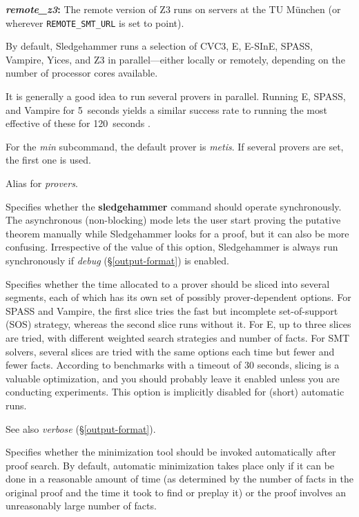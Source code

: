 \documentclass[a4paper,12pt]{article}
\begin{document}
\begin{enum}
\begin{enum}
\item[\labelitemi] \textbf{\textit{remote\_z3}:} The remote version of Z3 runs on
servers at the TU M\"unchen (or wherever \texttt{REMOTE\_SMT\_URL} is set to
point).
\end{enum}

By default, Sledgehammer runs a selection of CVC3, E, E-SInE, SPASS, Vampire,
Yices, and Z3 in parallel---either locally or remotely, depending on the number
of processor cores available.

It is generally a good idea to run several provers in parallel. Running E,
SPASS, and Vampire for 5~seconds yields a similar success rate to running the
most effective of these for 120~seconds \cite{boehme-nipkow-2010}.

For the \textit{min} subcommand, the default prover is \textit{metis}. If
several provers are set, the first one is used.

Alias for \textit{provers}.

Specifies whether the \textbf{sledgehammer} command should operate
synchronously. The asynchronous (non-blocking) mode lets the user start proving
the putative theorem manually while Sledgehammer looks for a proof, but it can
also be more confusing. Irrespective of the value of this option, Sledgehammer
is always run synchronously if \textit{debug} (\S\ref{output-format}) is
enabled.

Specifies whether the time allocated to a prover should be sliced into several
segments, each of which has its own set of possibly prover-dependent options.
For SPASS and Vampire, the first slice tries the fast but incomplete
set-of-support (SOS) strategy, whereas the second slice runs without it. For E,
up to three slices are tried, with different weighted search strategies and
number of facts. For SMT solvers, several slices are tried with the same options
each time but fewer and fewer facts. According to benchmarks with a timeout of
30 seconds, slicing is a valuable optimization, and you should probably leave it
enabled unless you are conducting experiments. This option is implicitly
disabled for (short) automatic runs.

\nopagebreak
{\small See also \textit{verbose} (\S\ref{output-format}).}

Specifies whether the minimization tool should be invoked automatically after
proof search. By default, automatic minimization takes place only if
it can be done in a reasonable amount of time (as determined by
the number of facts in the original proof and the time it took to find or
preplay it) or the proof involves an unreasonably large number of facts.


\end{enum}
\end{document}

